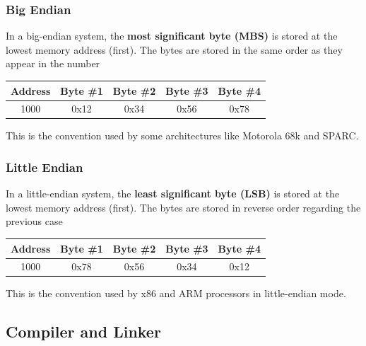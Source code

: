 \documentclass[../main]{subfiles}
\begin{document}
\subsubsection{Big Endian}
    In a big-endian system, the \textbf{most significant byte (MBS)} is stored at the lowest memory address (first).
The bytes are stored in the same order as they appear in the number
\begin{center}
    \begin{tabular}{|c|c|c|c|c|}
    \hline
    Address & Byte \#1 & Byte \#2 & Byte \#3 & Byte \#4 \\
    \hline
    1000 & 0x12 & 0x34 & 0x56 & 0x78 \\
    \hline
    \end{tabular}
\end{center}
This is the convention used by some architectures like Motorola 68k and SPARC.

\subsubsection{Little Endian}
In a little-endian system, the \textbf{least significant byte (LSB)} is stored at the lowest memory address (first).
The bytes are stored in reverse order regarding the previous case
\begin{center}
    \begin{tabular}{|c|c|c|c|c|}
    \hline
    Address & Byte \#1 & Byte \#2 & Byte \#3 & Byte \#4 \\
    \hline
    1000 & 0x78 & 0x56 & 0x34 & 0x12 \\
    \hline
    \end{tabular}
\end{center}
This is the convention used by x86 and ARM processors in little-endian mode.\newline

\subsection{Compiler and Linker}
\end{document}
